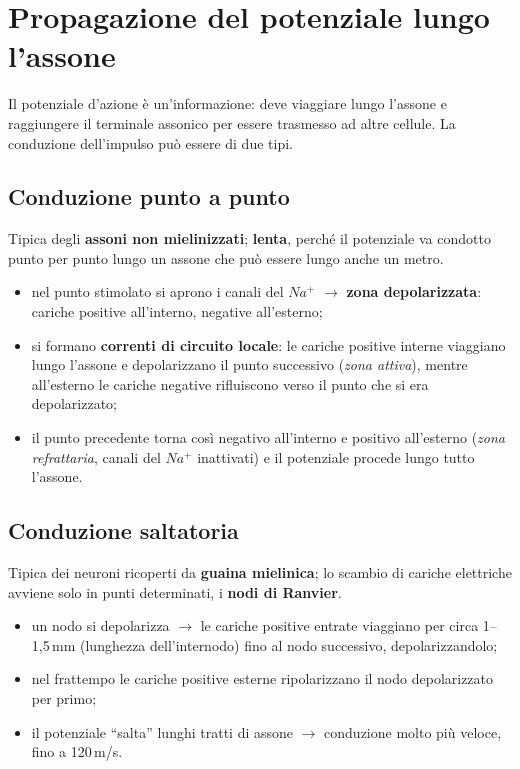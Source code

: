 \section{Propagazione del potenziale lungo l'assone}

Il potenziale d'azione è un'informazione: deve viaggiare lungo l'assone e raggiungere il terminale
assonico per essere trasmesso ad altre cellule. La conduzione dell'impulso può essere di due tipi.

\subsection{Conduzione punto a punto}

Tipica degli \textbf{assoni non mielinizzati}; \textbf{lenta}, perché il potenziale va condotto
punto per punto lungo un assone che può essere lungo anche un metro.
\begin{itemize}
  \item nel punto stimolato si aprono i canali del $Na^+$ $\rightarrow$ \textbf{zona
    depolarizzata}: cariche positive all'interno, negative all'esterno;
  \item si formano \textbf{correnti di circuito locale}: le cariche positive interne viaggiano
    lungo l'assone e depolarizzano il punto successivo (\textit{zona attiva}), mentre all'esterno le
    cariche negative rifluiscono verso il punto che si era depolarizzato;
  \item il punto precedente torna così negativo all'interno e positivo all'esterno (\textit{zona
    refrattaria}, canali del $Na^+$ inattivati) e il potenziale procede lungo tutto l'assone.
\end{itemize}

\subsection{Conduzione saltatoria}

Tipica dei neuroni ricoperti da \textbf{guaina mielinica}; lo scambio di cariche elettriche avviene
solo in punti determinati, i \textbf{nodi di Ranvier}.
\begin{itemize}
  \item un nodo si depolarizza $\rightarrow$ le cariche positive entrate viaggiano per circa
    1--1,5\,mm (lunghezza dell'internodo) fino al nodo successivo, depolarizzandolo;
  \item nel frattempo le cariche positive esterne ripolarizzano il nodo depolarizzato per primo;
  \item il potenziale ``salta'' lunghi tratti di assone $\rightarrow$ conduzione molto più veloce,
    fino a 120\,m/s.
\end{itemize}

